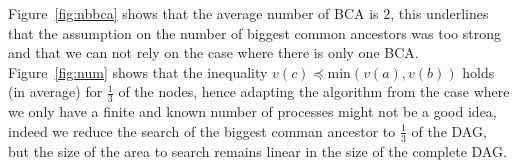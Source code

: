 Figure~\ref{fig:nbbca} shows that the average number of BCA is $2$, this underlines that the assumption on the number of biggest common ancestors was too strong and that we can not rely on the case where there is only one BCA. Figure~\ref{fig:num} shows that the inequality $v(c) \preccurlyeq \mathrm{min}(v(a),v(b))$ holds (in average) for $\frac{1}{3}$ of the nodes, hence adapting the algorithm from the case where we only have a finite and known number of processes might not be a good idea, indeed we reduce the search of the biggest comman ancestor to $\frac{1}{3}$ of the DAG, but the size of the area to search remains linear in the size of the complete DAG.
